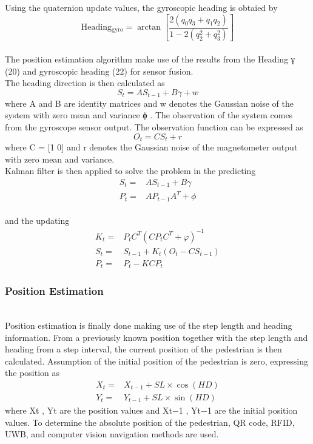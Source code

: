 \documentclass{l4proj}
\begin{document}
Using the quaternion update values, the gyroscopic heading is obtaied by
\begin{equation*} \textrm {Heading}{_{\textrm {gyro}}} = \arctan \left [{ {\frac {{2({q_{0}}{q_{3}} + {q_{1}}{q_{2}})}}{1 - 2(q_{2}^{2} + q_{3}^{2})}} }\right]\tag{22}\end{equation*}\\
The position estimation algorithm make use of the results from the Heading γ (20) and gyroscopic heading (22) for sensor fusion.\\
The heading direction is then calculated as 
\begin{equation*} {S_{t}} = A{S_{t - 1}} + B\gamma +w\tag{23}\end{equation*}
where A and B are identity matrices and w denotes the Gaussian noise of the system with zero mean and variance ϕ . The observation of the system comes from the gyroscope sensor output. The observation function can be expressed as
\begin{equation*} {O_{t}} = C{S_{t }}+ r\tag{24}\end{equation*} where C = [1 0] and r denotes the Gaussian noise of the magnetometer output with zero mean and variance.\\
Kalman filter is then applied to solve the problem in the predicting
\begin{align*} {S_{t}}=&A{S_{t - 1}} + B\gamma \tag{27}\\ {P_{t}}=&A{P_{t - 1}}{A^{T}} + \phi\tag{28}\end{align*}\\
and the updating
\begin{align*}{K_{t}}=&{P_{t}}{C^{T}}{(C{P_{t}}{C^{T}} + \varphi)^{ - 1}}\tag{29}\\ {S_{t}}=&{S_{t - 1}} + {K_{t}}({O_{t}} - C{S_{t - 1}})\tag{30}\\ {P_{t}}=&{P_{t}} - KC{P_{t}}\tag{31}\end{align*}

\subsubsection{Position Estimation}~\\
Position estimation is finally done making use of the step length and heading information. From a previously known position together with the step length and heading from a step interval\cite{lilkovi}, the current position of the pedestrian is then calculated. Assumption of the initial position of the pedestrian is zero, expressing the position as \begin{align*} X_{t}=&X_{t - 1} + SL \times \cos (HD) \tag{32}\\ Y_{t}=&Y_{t - 1} + SL \times \sin (HD) \tag{33}\end{align*}
where Xt , Yt are the position values and Xt−1 , Yt−1 are the initial position values. To determine the absolute position of the pedestrian, QR code, RFID, UWB, and computer vision navigation methods are used.\cite{positionestimate}\\
\end{document}
